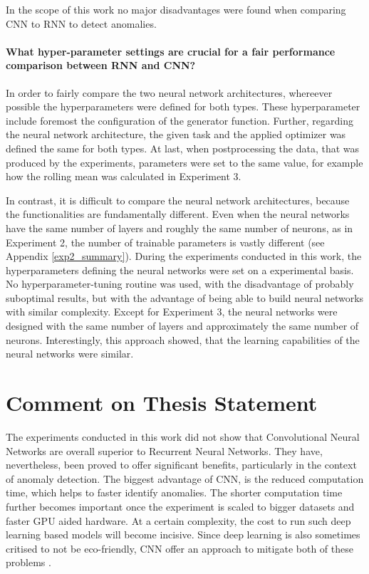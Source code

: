 In the scope of this work no major disadvantages were found when comparing CNN to RNN to detect anomalies.


\paragraph{What hyper-parameter settings are crucial for a fair performance comparison between RNN and CNN?} In order to fairly compare the two neural network architectures, whereever possible the hyperparameters were defined for both types. These hyperparameter include foremost the configuration of the generator function. Further, regarding the neural network architecture, the given task and the applied optimizer was defined the same for both types. At last, when postprocessing the data, that was produced by the experiments, parameters were set to the same value, for example how the rolling mean was calculated in Experiment 3.

In contrast, it is difficult to compare the neural network architectures, because the functionalities are fundamentally different. Even when the neural networks have the same number of layers and roughly the same number of neurons, as in Experiment 2, the number of trainable parameters is vastly different (see Appendix \ref{exp2_summary}). During the experiments conducted in this work, the hyperparameters defining the neural networks were set on a experimental basis. No hyperparameter-tuning routine was used, with the disadvantage of probably suboptimal results, but with the advantage of being able to build neural networks with similar complexity. Except for Experiment 3, the neural networks were designed with the same number of layers and approximately the same number of neurons. Interestingly, this approach showed, that the learning capabilities of the neural networks were similar.

\section{Comment on Thesis Statement}

The experiments conducted in this work did not show that Convolutional Neural Networks are overall superior to Recurrent Neural Networks. They have, nevertheless, been proved to offer significant benefits, particularly in the context of anomaly detection. The biggest advantage of CNN, is the reduced computation time, which helps to faster identify anomalies. The shorter computation time further becomes important once the experiment is scaled to bigger datasets and faster GPU aided hardware. At a certain complexity, the cost to run such deep learning based models will become incisive. Since deep learning is also sometimes critised to not be eco-friendly, CNN offer an approach to mitigate both of these problems \parencite{Walleser2021}.

